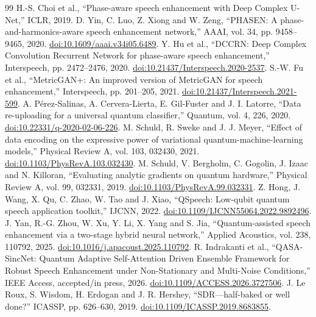 \documentclass[10pt,a4paper]{article}
\begin{document}
\begin{thebibliography}{99}
 H.-S. Choi et al., ``Phase-aware speech enhancement with Deep Complex U-Net,'' ICLR, 2019.
 D. Yin, C. Luo, Z. Xiong and W. Zeng, ``PHASEN: A phase-and-harmonics-aware speech enhancement network,'' AAAI, vol. 34, pp. 9458--9465, 2020. \href{https://doi.org/10.1609/aaai.v34i05.6489}{doi:10.1609/aaai.v34i05.6489}.
 Y. Hu et al., ``DCCRN: Deep Complex Convolution Recurrent Network for phase-aware speech enhancement,'' Interspeech, pp. 2472--2476, 2020. \href{https://doi.org/10.21437/Interspeech.2020-2537}{doi:10.21437/Interspeech.2020-2537}.
 S.-W. Fu et al., ``MetricGAN+: An improved version of MetricGAN for speech enhancement,'' Interspeech, pp. 201--205, 2021. \href{https://doi.org/10.21437/Interspeech.2021-599}{doi:10.21437/Interspeech.2021-599}.
 A. P\'erez-Salinas, A. Cervera-Lierta, E. Gil-Fuster and J. I. Latorre, ``Data re-uploading for a universal quantum classifier,'' Quantum, vol. 4, 226, 2020. \href{https://doi.org/10.22331/q-2020-02-06-226}{doi:10.22331/q-2020-02-06-226}.
 M. Schuld, R. Sweke and J. J. Meyer, ``Effect of data encoding on the expressive power of variational quantum-machine-learning models,'' Physical Review A, vol. 103, 032430, 2021. \href{https://doi.org/10.1103/PhysRevA.103.032430}{doi:10.1103/PhysRevA.103.032430}.
 M. Schuld, V. Bergholm, C. Gogolin, J. Izaac and N. Killoran, ``Evaluating analytic gradients on quantum hardware,'' Physical Review A, vol. 99, 032331, 2019. \href{https://doi.org/10.1103/PhysRevA.99.032331}{doi:10.1103/PhysRevA.99.032331}.
 Z. Hong, J. Wang, X. Qu, C. Zhao, W. Tao and J. Xiao, ``QSpeech: Low-qubit quantum speech application toolkit,'' IJCNN, 2022. \href{https://doi.org/10.1109/IJCNN55064.2022.9892496}{doi:10.1109/IJCNN55064.2022.9892496}.
 J. Yan, R.-G. Zhou, W. Xu, Y. Li, X. Yang and S. Jia, ``Quantum-assisted speech enhancement via a two-stage hybrid neural network,'' Applied Acoustics, vol. 238, 110792, 2025. \href{https://doi.org/10.1016/j.apacoust.2025.110792}{doi:10.1016/j.apacoust.2025.110792}.
 R. Indrakanti et al., ``QASA-SincNet: Quantum Adaptive Self-Attention Driven Ensemble Framework for Robust Speech Enhancement under Non-Stationary and Multi-Noise Conditions,'' IEEE Access, accepted/in press, 2026. \href{https://doi.org/10.1109/ACCESS.2026.3727506}{doi:10.1109/ACCESS.2026.3727506}.
 J. Le Roux, S. Wisdom, H. Erdogan and J. R. Hershey, ``SDR---half-baked or well done?'' ICASSP, pp. 626--630, 2019. \href{https://doi.org/10.1109/ICASSP.2019.8683855}{doi:10.1109/ICASSP.2019.8683855}.

\end{thebibliography}
\end{document}
